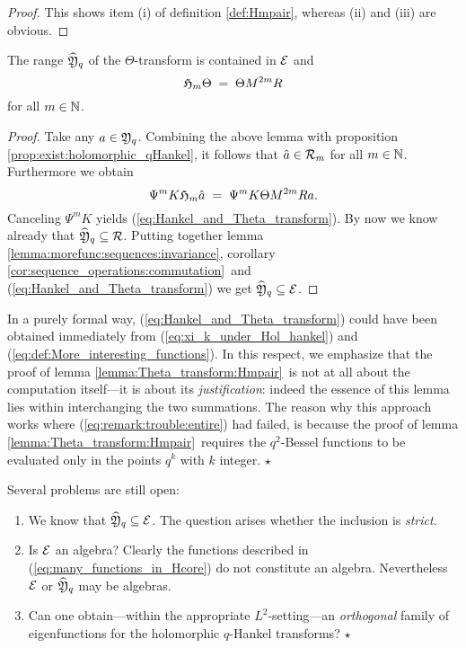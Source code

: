 \begin{proof}
This shows item (i) of definition \ref{def:Hmpair}, whereas (ii) and (iii) are obvious.
\end{proof}



\begin{cor}
The range\/ $\widehat{\mathfrak Y}_q$ of the\/ $\Theta$-transform is contained in\/ $\mathcal E$ and
\begin{equation}\label{eq:Hankel_and_Theta_transform}
  \mathfrak{H}_{m} \Theta \;=\; \Theta M^{2m} R
\end{equation}
for all\/ $m\in\mathbb{N}$.
\end{cor}

\begin{proof}
Take any $a\in {\mathfrak Y}_q$.
Combining the above lemma with proposition \ref{prop:exist:holomorphic_qHankel},
it follows that $\hat{a} \in {\mathcal R}_{m}$ for all $m\in \mathbb{N}$.
Furthermore we obtain
$$  \Psi^m K \mathfrak{H}_{m} \hat{a}  \;=\;  \Psi^m K \Theta M^{2m} R a. $$
Canceling $\Psi^m K$ yields (\ref{eq:Hankel_and_Theta_transform}).
By now we know already that $\widehat{\mathfrak Y}_q \subseteq \mathcal R$.
Putting together lemma \ref{lemma:morefunc:sequences:invariance},
corollary \ref{cor:sequence_operations:commutation}\ and (\ref{eq:Hankel_and_Theta_transform})
we get $\widehat{\mathfrak Y}_q \subseteq \mathcal E$.
\end{proof}



\begin{remark} \rm
In a purely formal way, (\ref{eq:Hankel_and_Theta_transform}) could have been
obtained immediately from
(\ref{eq:xi_k_under_Hol_hankel}) and (\ref{eq:def:More_interesting_functions}).
In this respect, we emphasize that the proof of
lemma \ref{lemma:Theta_transform:Hmpair}\ is not at all about the computation
itself---it is about its {\em justification\/}: indeed the essence of this lemma lies
within interchanging the two summations.
The reason why this approach works where (\ref{eq:remark:trouble:entire}) had failed,
is because the proof of lemma \ref{lemma:Theta_transform:Hmpair}\ requires
the $q^2$-Bessel functions to be evaluated only in the points $q^k$ with $k$ integer.
\hfill $\star$
\end{remark}


\begin{questions} \rm
Several problems are still open:
\begin{enumerate}
\item
We know that $\widehat{\mathfrak Y}_q \subseteq \mathcal E$.
The question arises whether the inclusion is {\em strict}.
\item
Is $\mathcal E$ an algebra?
Clearly the functions described in (\ref{eq:many_functions_in_Hcore}) do not
constitute an algebra. Nevertheless $\mathcal E$ or $\widehat{\mathfrak Y}_q$ may be algebras.
\item
Can one obtain---within the appropriate $L^2$-setting---an {\em orthogonal\/} family
of eigenfunctions for the holomorphic $q$-Hankel transforms?
\hfill $\star$
\end{enumerate}
\end{questions}
